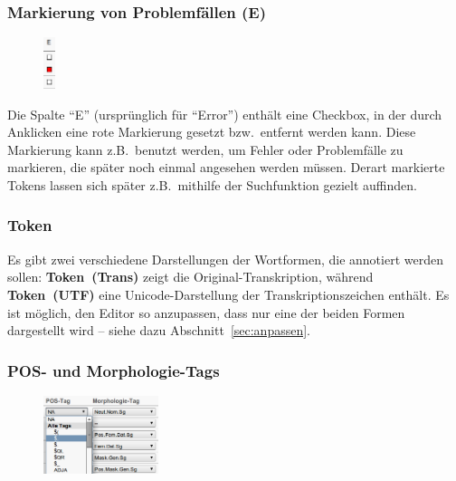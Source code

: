 \documentclass[11pt,a4paper,parskip=half]{scrartcl}
\begin{document}
\subsubsection{Markierung von Problemfällen (E)}

\begin{figure}
  \begin{center}\vspace{-2em}
    \includegraphics[width=0.031\textwidth]{img/error.png}
  \end{center}
\end{figure}

Die Spalte "`E"' (ursprünglich für "`Error"') enthält eine Checkbox, in der
durch Anklicken eine rote Markierung gesetzt bzw.\ entfernt werden kann.  Diese
Markierung kann z.B.\ benutzt werden, um Fehler oder Problemfälle zu markieren,
die später noch einmal angesehen werden müssen.  Derart markierte Tokens lassen
sich später z.B.\ mithilfe der Suchfunktion gezielt auffinden.

\subsubsection{Token}

Es gibt zwei verschiedene Darstellungen der Wortformen, die annotiert
werden sollen: \textbf{Token~(Trans)} zeigt die
Original-Transkription, während \textbf{Token~(UTF)} eine
Unicode-Darstellung der Transkriptionszeichen enthält.  Es ist
möglich, den Editor so anzupassen, dass nur eine der beiden Formen
dargestellt wird -- siehe dazu Abschnitt~\ref{sec:anpassen}.

\subsubsection{POS- und Morphologie-Tags}

\begin{figure}
  \begin{center}\vspace{-2em}
    \includegraphics[width=0.3\textwidth]{img/pos.png}
  \end{center}
\end{figure}
\end{document}

